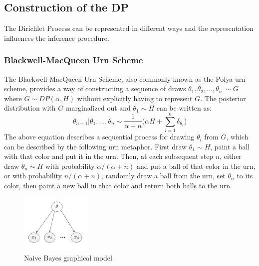 \subsection{Construction of the DP}

The Dirichlet Process can be represented in different ways and the representation influences the inference procedure.

\subsubsection{Blackwell-MacQueen Urn Scheme}

The Blackwell-MacQueen Urn Scheme, also commonly known as the Polya urn scheme, provides a way of constructing a sequence of draws $\theta_1, \theta_2,...,\theta_n~\sim G$ where $G\sim DP(\alpha, H)$ without explicitly having to represent $G$. The posterior distribution with $G$ marginalized out and $\theta_1 \sim H$ can be written as:
\begin{equation}\label{equ:urn}
    \theta_{n+1}|\theta_1,...,\theta_n \sim \frac{1}{\alpha+n}\bigg(\alpha H + \sum_{i=1}^{n}\delta_{\theta_i}\bigg)
\end{equation}
The above equation describes a sequential process for drawing $\theta_i$ from $G$, which can be described by the following urn metaphor. First draw $\theta_1 \sim H$, paint a ball with that color and put it in the urn. Then, at each subsequent step $n$, either draw $\theta_n \sim H$ with probability $\alpha/(\alpha + n)$ and put a ball of that color in the urn, or with probability $n/(\alpha + n)$, randomly draw a ball from the urn, set $\theta_n$ to its color, then paint a new ball in that color and return both balls to the urn.

\begin{figure}[tbhp]
    \centering
    \includegraphics[width=0.3\textwidth, trim={10 10 10 10}]{figures/naive_bayes_gm.png}
    \caption{Naive Bayes graphical model}
    \label{fig:naive_bayes_gm}
\end{figure}


